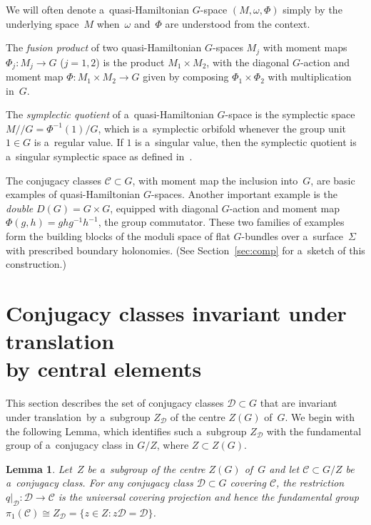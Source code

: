 \documentclass[11pt]{article}
\numberwithin{equation}{section}
\newtheorem{Lemma}[Theorem]{Lemma}
\begin{document}
We will often denote a~quasi-Hamiltonian $G$-space $(M,\omega,\Phi)$ simply by the underlying space~$M$ when~$\omega$
and~$\Phi$ are understood from the context.

The \emph{fusion product} of two quasi-Hamiltonian $G$-spaces $M_j$ with moment maps $\Phi_j:M_j \to G$ ($j=1,2$) is the
product $M_1\times M_2$, with the diagonal $G$-action and moment map $\Phi:M_1 \times M_2 \to G$ given by composing
$\Phi_1 \times \Phi_2$ with multiplication in~$G$.

The \emph{symplectic quotient} of a~quasi-Hamiltonian $G$-space is the symplectic space $M/ /G = \Phi^{-1}(1)/G$, which
is a~symplectic orbifold whenever the group unit $1 \in G$ is a~regular value.
If $1$ is a~singular value, then the symplectic quotient is a~singular symplectic space as def\/ined in~\cite{MS}.

The conjugacy classes $\mathcal{C}\subset G$, with moment map the inclusion into~$G$, are basic examples of
quasi-Hamiltonian $G$-spaces.
Another important example is the \emph{double} $D(G)=G\times G$, equipped with diagonal $G$-action and moment map
$\Phi(g,h)=ghg^{-1}h^{-1}$, the group commutator.
These two families of examples form the building blocks of the moduli space of f\/lat $G$-bundles over a~surface~$\Sigma$
with prescribed boundary holonomies.
(See Section~\ref{sec:comp} for a~sketch of this construction.)

\section{Conjugacy classes invariant under translation \\
by central elements}

This section describes the set of conjugacy classes $\mathcal{D}\subset G$ that are invariant under translation~by
a~subgroup $Z_\mathcal{D}$ of the centre $Z(G)$ of~$G$.
We begin with the following Lemma, which identif\/ies such a~subgroup $Z_\mathcal{D}$ with the fundamental group of
a~conjugacy class in $G/Z$, where $Z\subset Z(G)$.

\begin{Lemma}
\label{lemma:pi1ofC}
Let~$Z$ be a~subgroup of the centre $Z(G)$ of~$G$ and let $\mathcal{C} \subset G/Z$ be a~conjugacy class.
For any conjugacy class $\mathcal{D}\subset G$ covering $\mathcal{C}$, the restriction $q|_{\mathcal{D}}: \mathcal{D}
\to \mathcal{C}$ is the universal covering projection and hence the fundamental group $\pi_1(\mathcal{C}) \cong
Z_\mathcal{D}=\{z \in Z \colon z\mathcal{D} = \mathcal{D} \}$.
\end{Lemma}
\end{document}
